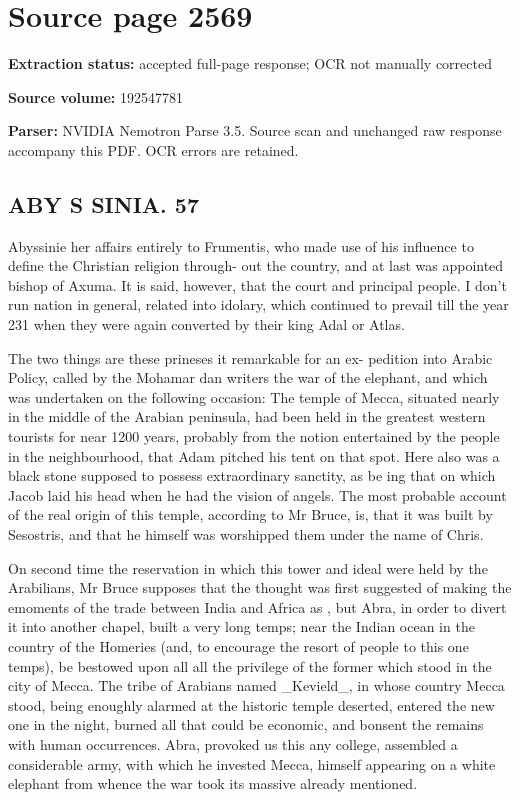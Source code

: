\clearpage
\section{Source page 2569}
\textbf{Extraction status:} accepted full-page response; OCR not manually corrected\par
\textbf{Source volume:} 192547781\par
\textbf{Parser:} NVIDIA Nemotron Parse 3.5. Source scan and unchanged raw response accompany this PDF. OCR errors are retained.\par\medskip
\subsection*{ABY S SINIA. 57}
Abyssinie her affairs entirely to Frumentis, who made use of his influence to define the Christian religion through- out the country, and at last was appointed bishop of Axuma. It is said, however, that the court and principal people. I don’t run nation in general, related into idolary, which continued to prevail till the year 231 when they were again converted by their king Adal or Atlas.\par\medskip
The two things are these prineses it remarkable for an ex- pedition into Arabic Policy, called by the Mohamar dan writers the war of the elephant, and which was undertaken on the following occasion: The temple of Mecca, situated nearly in the middle of the Arabian peninsula, had been held in the greatest western tourists for near 1200 years, probably from the notion entertained by the people in the neighbourhood, that Adam pitched his tent on that spot. Here also was a black stone supposed to possess extraordinary sanctity, as be ing that on which Jacob laid his head when he had the vision of angels. The most probable account of the real origin of this temple, according to Mr Bruce, is, that it was built by Sesostris, and that he himself was worshipped them under the name of Chris.\par\medskip
On second time the reservation in which this tower and ideal were held by the Arabilians, Mr Bruce supposes that the thought was first suggested of making the emoments of the trade between India and Africa as , but Abra, in order to divert it into another chapel, built a very long temps; near the Indian ocean in the country of the Homeries (and, to encourage the resort of people to this one temps), be bestowed upon all all the privilege of the former which stood in the city of Mecca. The tribe of Arabians named \_Kevield\_, in whose country Mecca stood, being enoughly alarmed at the historic temple deserted, entered the new one in the night, burned all that could be economic, and bonsent the remains with human occurrences. Abra, provoked us this any college, assembled a considerable army, with which he invested Mecca, himself appearing on a white elephant from whence the war took its massive already mentioned.\par\medskip
